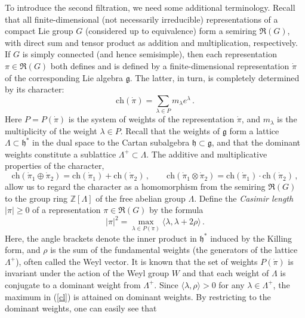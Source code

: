 \documentclass[12pt,a4paper]{article}
\numberwithin{equation}{section}
\theoremstyle{theorem}
\theoremstyle{remark}
\begin{document}
To introduce the second filtration, we need some additional terminology. Recall that all finite-dimensional (not necessarily irreducible) representations of a compact Lie group $G$ (considered up to equivalence) form a semiring $\mathfrak{R}(G)$, with direct sum and tensor product as addition and multiplication, respectively.
If $G$ is simply connected (and hence semisimple), then each representation $\pi\in \mathfrak{R}(G)$ both defines and is defined by a finite-dimensional representation $\dot \pi$ of the corresponding Lie algebra $\mathfrak{g}$. The latter, in turn, is completely determined by its character:
\begin{equation}
    \mathrm{ch}(\dot \pi)=\sum_{\lambda\in P} m_\lambda e^{\lambda}\,.
\end{equation}
Here $P=P(\dot \pi)$ is the system of weights of the representation $\dot \pi$, and $m_\lambda$ is the multiplicity of the weight $\lambda\in P$. Recall that the weights of $\mathfrak{g}$ form a lattice $\Lambda\subset \mathfrak{h}^\ast$ in the dual space to the Cartan subalgebra $\mathfrak{h}\subset \mathfrak{g}$, and that the dominant weights constitute a sublattice $\Lambda^+\subset \Lambda$. The additive and multiplicative properties of the character,
\begin{equation}
    \mathrm{ch}(\dot \pi_1\oplus \dot \pi_2)=\mathrm{ch}(\dot \pi_1)+\mathrm{ch}(\dot \pi_2)\,,\qquad   
    \mathrm{ch}(\dot \pi_1\otimes  \dot \pi_2)=\mathrm{ch}(\dot \pi_1)\cdot \mathrm{ch}(\dot \pi_2)\,,
\end{equation}
allow us to regard the character as a homomorphism from the semiring $\mathfrak{R}(G)$ to the group ring $\mathbb{Z}[\Lambda]$ of the free abelian group $\Lambda$. 
Define the {\it Casimir length} $|\pi|\geq 0$ of a representation $\pi\in \mathfrak{R}(G)$ by the formula
\begin{equation}\label{cl}
    |\pi|^2= \max_{\lambda\in P(\dot\pi)} \langle \lambda,\lambda+2\rho\rangle\,.
\end{equation}
Here, the angle brackets denote the inner product in $\mathfrak{h}^\ast$ induced by the Killing form, and $\rho$ is the sum of the fundamental weights (the generators of the lattice $\Lambda^+$), often called the Weyl vector.  It is known that the set of weights $P(\dot\pi)$ is invariant under the action of the Weyl group $W$ and that each weight of $\Lambda$ is conjugate to a dominant weight from $\Lambda^+$.  Since $\langle \lambda,\rho\rangle>0$ for any $\lambda\in \Lambda^+$, the maximum in (\ref{cl}) is attained on  dominant weights. By restricting to the dominant weights, one can easily see that
\end{document}
